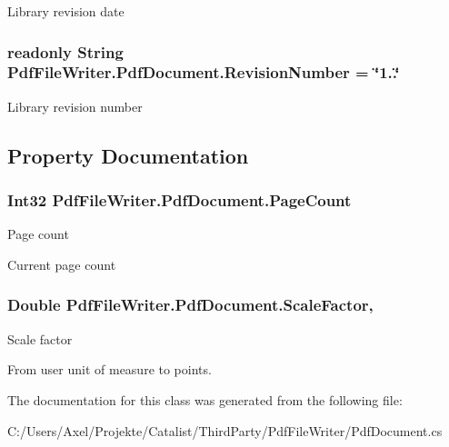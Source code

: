 Library revision date 

\subsubsection[{\texorpdfstring{Revision\+Number}{RevisionNumber}}]{\setlength{\rightskip}{0pt plus 5cm}readonly String Pdf\+File\+Writer.\+Pdf\+Document.\+Revision\+Number = \char`\"{}1..\char`\"{}\hspace{0.3cm}{\ttfamily [static]}}\hypertarget{class_pdf_file_writer_1_1_pdf_document_a6139648f3e934f6fa99a13dd6aa13055}{}\label{class_pdf_file_writer_1_1_pdf_document_a6139648f3e934f6fa99a13dd6aa13055}


Library revision number 



\subsection{Property Documentation}
\subsubsection[{\texorpdfstring{Page\+Count}{PageCount}}]{\setlength{\rightskip}{0pt plus 5cm}Int32 Pdf\+File\+Writer.\+Pdf\+Document.\+Page\+Count\hspace{0.3cm}{\ttfamily [get]}}\hypertarget{class_pdf_file_writer_1_1_pdf_document_ac1aafc4b240f378a37d93f6645331dc4}{}\label{class_pdf_file_writer_1_1_pdf_document_ac1aafc4b240f378a37d93f6645331dc4}


Page count 

Current page count 
\subsubsection[{\texorpdfstring{Scale\+Factor}{ScaleFactor}}]{\setlength{\rightskip}{0pt plus 5cm}Double Pdf\+File\+Writer.\+Pdf\+Document.\+Scale\+Factor\hspace{0.3cm}{\ttfamily [get]}, {\ttfamily [set]}}\hypertarget{class_pdf_file_writer_1_1_pdf_document_a978123b82efb2713ddfb4a44e4f428cc}{}\label{class_pdf_file_writer_1_1_pdf_document_a978123b82efb2713ddfb4a44e4f428cc}


Scale factor 

From user unit of measure to points. 

The documentation for this class was generated from the following file\+:\begin{DoxyCompactItemize}
\item 
C\+:/\+Users/\+Axel/\+Projekte/\+Catalist/\+Third\+Party/\+Pdf\+File\+Writer/Pdf\+Document.\+cs\end{DoxyCompactItemize}
